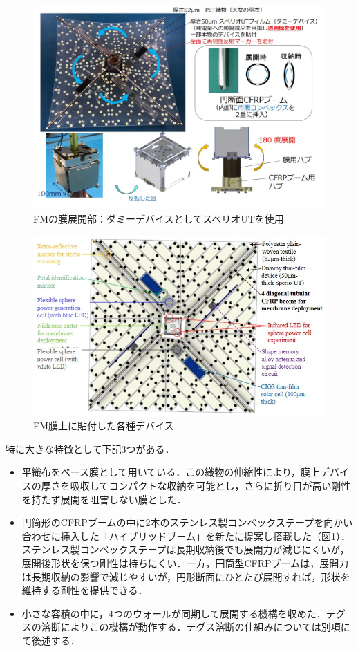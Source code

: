 \begin{figure}[H]
	\centering
	\includegraphics[width=.8\textwidth]{03/fig/3-9-3-1-2.jpg}
	\caption{FMの膜展開部：ダミーデバイスとしてスペリオUTを使用}
	\label{fig3-9-3-1-2}
\end{figure}
\begin{figure}[H]
	\centering
	\includegraphics[width=.8\textwidth]{03/fig/3-9-3-1-3.jpg}
	\caption{FM膜上に貼付した各種デバイス}
	\label{fig3-9-3-1-3}
\end{figure}
特に大きな特徴として下記3つがある．
\begin{itemize}
	\item 平織布をベース膜として用いている．この織物の伸縮性により，膜上デバイスの厚さを吸収してコンパクトな収納を可能とし，さらに折り目が高い剛性を持たず展開を阻害しない膜とした．
	\item 円筒形のCFRPブームの中に2本のステンレス製コンベックステープを向かい合わせに挿入した「ハイブリッドブーム」を新たに提案し搭載した（図\ref{fig3-9-3-1-2}）．ステンレス製コンベックステープは長期収納後でも展開力が減じにくいが，展開後形状を保つ剛性は持ちにくい．一方，円筒型CFRPブームは，展開力は長期収納の影響で減じやすいが，円形断面にひとたび展開すれば，形状を維持する剛性を提供できる．
	\item 小さな容積の中に，4つのウォールが同期して展開する機構を収めた．テグスの溶断によりこの機構が動作する．テグス溶断の仕組みについては別項にて後述する．
\end{itemize}

